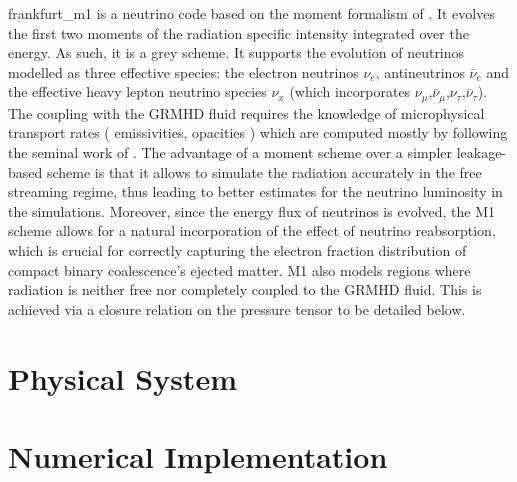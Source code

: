 frankfurt_m1 is a neutrino code based on the moment formalism of \cite{FIM1_FIL_M1_ShibataMoments}. It evolves the first two moments of the radiation specific intensity integrated over the energy. As such, it is a grey scheme. It supports the evolution of neutrinos modelled as three effective species: the electron neutrinos $\nu_e$, antineutrinos $\bar{\nu}_e$ and the effective heavy lepton neutrino species $\nu_x$ (which incorporates $\nu_\mu$,$\bar{\nu}_\mu$,$\nu_\tau$,$\bar{\nu}_\tau$).
The coupling with the GRMHD fluid requires the knowledge of microphysical transport rates ( emissivities, opacities ) which are computed mostly by following the seminal work of \cite{FILM1_FIL_M1_Ruffert1996}. The advantage of a moment scheme over a simpler leakage-based scheme is that it allows to simulate  the radiation accurately in the free streaming regime, thus leading to better estimates for the neutrino luminosity in the simulations. Moreover, since the energy flux of neutrinos is evolved, the M1 scheme allows for a natural incorporation of the effect of neutrino reabsorption, which is crucial for correctly capturing the electron fraction distribution of compact binary coalescence's ejected matter.
M1 also models regions where radiation is neither free nor completely coupled to the GRMHD fluid. This is achieved via a closure relation on the pressure tensor to be detailed below.

\section{Physical System}

\section{Numerical Implementation}

